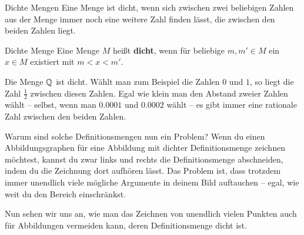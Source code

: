 \documentclass[../../main.tex]{subfiles}
\begin{document}
\begin{advanced}{Dichte Mengen}
    Eine Menge ist dicht, wenn sich zwischen zwei beliebigen Zahlen aus der Menge immer noch eine weitere Zahl finden lässt, die zwischen den beiden Zahlen liegt.
    
    \begin{definition}{Dichte Menge}
        Eine Menge $M$ heißt \textbf{dicht}, wenn für beliebige $m,m'\in M$ ein $x\in M$ existiert mit $m<x<m'$.
    \end{definition}
    
    \begin{advexample}{}
        Die Menge $\mathbb{Q}$ ist dicht. Wählt man zum Beispiel die Zahlen $0$ und $1$, so liegt die Zahl $\frac{1}{2}$ zwischen diesen Zahlen. Egal wie klein man den Abstand zweier Zahlen wählt -- selbst, wenn man $0.0001$ und $0.0002$ wählt -- es gibt immer eine rationale Zahl zwischen den beiden Zahlen.
    \end{advexample}
\end{advanced}

Warum sind solche Definitionsmengen nun ein Problem? Wenn du einen Abbildungsgraphen für eine Abbildung mit dichter Definitionsmenge zeichnen möchtest, kannst du zwar links und rechts die Definitionsmenge abschneiden, indem du die Zeichnung dort aufhören lässt. Das Problem ist, dass trotzdem immer unendlich viele mögliche Argumente in deinem Bild auftauchen -- egal, wie weit du den Bereich einschränkst.

Nun sehen wir uns an, wie man das Zeichnen von unendlich vielen Punkten auch für Abbildungen vermeiden kann, deren Definitionsmenge dicht ist.
\end{document}
